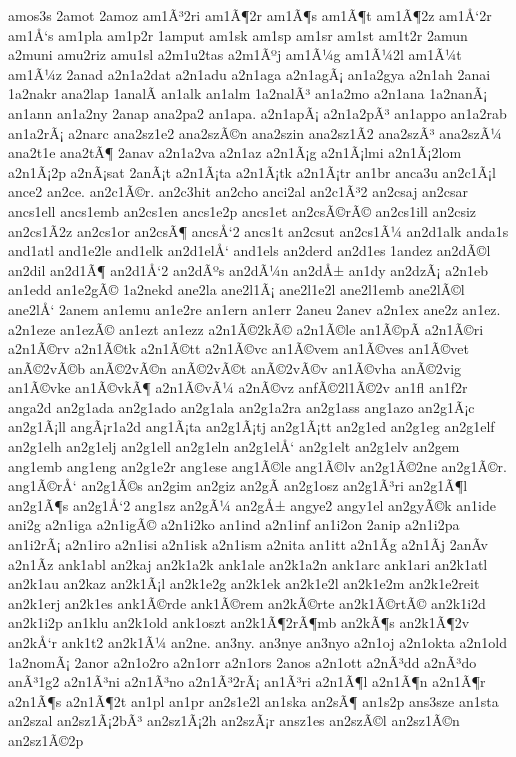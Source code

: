 {amos3s
2amot
2amoz
am1Ã³2ri
am1Ã¶2r
am1Ã¶s
am1Ã¶t
am1Ã¶2z
am1Å‘2r
am1Å‘s
am1pla
am1p2r
1amput
am1sk
am1sp
am1sr
am1st
am1t2r
2amun
a2muni
amu2riz
amu1sl
a2m1u2tas
a2m1Ãºj
am1Ã¼g
am1Ã¼2l
am1Ã¼t
am1Ã¼z
2anad
a2n1a2dat
a2n1adu
a2n1aga
a2n1agÃ¡
an1a2gya
a2n1ah
2anai
1a2nakr
ana2lap
1analÃ­
an1alk
an1alm
1a2nalÃ³
an1a2mo
a2n1ana
1a2nanÃ¡
an1ann
an1a2ny
2anap
ana2pa2
an1apa.
a2n1apÃ¡
a2n1a2pÃ³
an1appo
an1a2rab
an1a2rÃ¡
a2narc
ana2sz1e2
ana2szÃ©n
ana2szin
ana2sz1Ã­2
ana2szÃ³
ana2szÃ¼
ana2t1e
ana2tÃ¶
2anav
a2n1a2va
a2n1az
a2n1Ã¡g
a2n1Ã¡lmi
a2n1Ã¡2lom
a2n1Ã¡2p
a2nÃ¡sat
2anÃ¡t
a2n1Ã¡ta
a2n1Ã¡tk
a2n1Ã¡tr
an1br
anca3u
an2c1Ã¡l
ance2
an2ce.
an2c1Ã©r.
an2c3hit
an2cho
anci2al
an2c1Ã³2
an2csaj
an2csar
ancs1ell
ancs1emb
an2cs1en
ancs1e2p
ancs1et
an2csÃ©rÃ©
an2cs1ill
an2csiz
an2cs1Ã­2z
an2cs1or
an2csÃ¶
ancsÅ‘2
ancs1t
an2csut
an2cs1Ã¼
an2d1alk
anda1s
and1atl
and1e2le
and1elk
an2d1elÅ‘
and1els
an2derd
an2d1es
1andez
an2dÃ©l
an2dil
an2d1Ã¶
an2d1Å‘2
an2dÃºs
an2dÃ¼n
an2dÅ±
an1dy
an2dzÃ¡
a2n1eb
an1edd
an1e2gÃ©
1a2nekd
ane2la
ane2l1Ã¡
ane2l1e2l
ane2l1emb
ane2lÃ©l
ane2lÅ‘
2anem
an1emu
an1e2re
an1ern
an1err
2aneu
2anev
a2n1ex
ane2z
an1ez.
a2n1eze
an1ezÃ©
an1ezt
an1ezz
a2n1Ã©2kÃ©
a2n1Ã©le
an1Ã©pÃ­
a2n1Ã©ri
a2n1Ã©rv
a2n1Ã©tk
a2n1Ã©tt
a2n1Ã©vc
an1Ã©vem
an1Ã©ves
an1Ã©vet
anÃ©2vÃ©b
anÃ©2vÃ©n
anÃ©2vÃ©t
anÃ©2vÃ©v
an1Ã©vha
anÃ©2vig
an1Ã©vke
an1Ã©vkÃ¶
a2n1Ã©vÃ¼
a2nÃ©vz
anfÃ©2l1Ã©2v
an1fl
an1f2r
anga2d
an2g1ada
an2g1ado
an2g1ala
an2g1a2ra
an2g1ass
ang1azo
an2g1Ã¡c
an2g1Ã¡ll
angÃ¡r1a2d
ang1Ã¡ta
an2g1Ã¡tj
an2g1Ã¡tt
an2g1ed
an2g1eg
an2g1elf
an2g1elh
an2g1elj
an2g1ell
an2g1eln
an2g1elÅ‘
an2g1elt
an2g1elv
an2gem
ang1emb
ang1eng
an2g1e2r
ang1ese
ang1Ã©le
ang1Ã©lv
an2g1Ã©2ne
an2g1Ã©r.
ang1Ã©rÅ‘
an2g1Ã©s
an2gim
an2giz
an2gÃ­
an2g1osz
an2g1Ã³ri
an2g1Ã¶l
an2g1Ã¶s
an2g1Å‘2
ang1sz
an2gÃ¼
an2gÅ±
angye2
angy1el
an2gyÃ©k
an1ide
ani2g
a2n1iga
a2n1igÃ©
a2n1i2ko
an1ind
a2n1inf
an1i2on
2anip
a2n1i2pa
an1i2rÃ¡
a2n1iro
a2n1isi
a2n1isk
a2n1ism
a2nita
an1itt
a2n1Ã­g
a2n1Ã­j
2anÃ­v
a2n1Ã­z
ank1abl
an2kaj
an2k1a2k
ank1ale
an2k1a2n
ank1arc
ank1ari
an2k1atl
an2k1au
an2kaz
an2k1Ã¡l
an2k1e2g
an2k1ek
an2k1e2l
an2k1e2m
an2k1e2reit
an2k1erj
an2k1es
ank1Ã©rde
ank1Ã©rem
an2kÃ©rte
an2k1Ã©rtÃ©
an2k1i2d
an2k1i2p
an1klu
an2k1old
ank1oszt
an2k1Ã¶2rÃ¶mb
an2kÃ¶s
an2k1Ã¶2v
an2kÅ‘r
ank1t2
an2k1Ã¼
an2ne.
an3ny.
an3nye
an3nyo
a2n1oj
a2n1okta
a2n1old
1a2nomÃ¡
2anor
a2n1o2ro
a2n1orr
a2n1ors
2anos
a2n1ott
a2nÃ³dd
a2nÃ³do
anÃ³1g2
a2n1Ã³ni
a2n1Ã³no
a2n1Ã³2rÃ¡
an1Ã³ri
a2n1Ã¶l
a2n1Ã¶n
a2n1Ã¶r
a2n1Ã¶s
a2n1Ã¶2t
an1pl
an1pr
an2s1e2l
an1ska
an2sÃ¶
an1s2p
ans3sze
an1sta
an2szal
an2sz1Ã¡2bÃ³
an2sz1Ã¡2h
an2szÃ¡r
ansz1es
an2szÃ©l
an2sz1Ã©n
an2sz1Ã©2p
}

